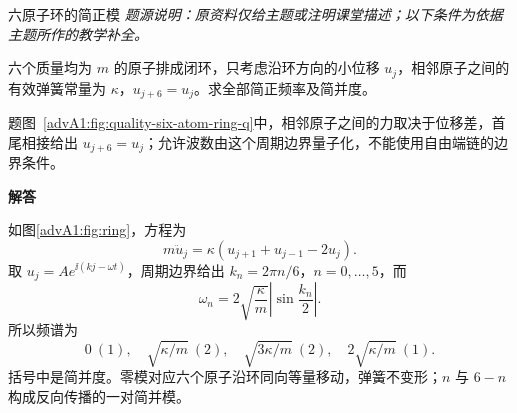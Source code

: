\begin{advexamplebox}{六原子环的简正模}\label{advA1:ex:six-atom-ring}
\emph{题源说明：原资料仅给主题或注明课堂描述；以下条件为依据主题所作的教学补全。}\par
六个质量均为 $m$ 的原子排成闭环，只考虑沿环方向的小位移 $u_j$，相邻原子之间的有效弹簧常量为 $\kappa$，$u_{j+6}=u_j$。求全部简正频率及简并度。

\begin{qualityfigure}
\label{advA1:fig:quality-six-atom-ring-q}
\end{qualityfigure}
\end{advexamplebox}
\AdvHideHeadingtrue
\begin{advsolution}题图~\ref{advA1:fig:quality-six-atom-ring-q}中，相邻原子之间的力取决于位移差，首尾相接给出 $u_{j+6}=u_j$；允许波数由这个周期边界量子化，不能使用自由端链的边界条件。

\noindent\begin{minipage}{\linewidth}{\bfseries\color{DeepBlue}解答}\par
\begin{center}\begin{minipage}{\linewidth}\centering
{}
\label{advA1:fig:ring}
\end{minipage}\end{center}\end{minipage}

如图\ref{advA1:fig:ring}，方程为
\[
 m\ddot u_j=\kappa(u_{j+1}+u_{j-1}-2u_j).
\]
取 $u_j=Ae^{\ii(kj-\omega t)}$，周期边界给出
$k_n=2\pi n/6$，$n=0,\ldots,5$，而
\[
 \omega_n=2\sqrt{\frac\kappa m}\left|\sin\frac{k_n}{2}\right|.
\]
所以频谱为
\[
 \boxed{0\ (1),\quad \sqrt{\kappa/m}\ (2),\quad
 \sqrt{3\kappa/m}\ (2),\quad 2\sqrt{\kappa/m}\ (1)}.
\]
括号中是简并度。零模对应六个原子沿环同向等量移动，弹簧不变形；$n$ 与 $6-n$ 构成反向传播的一对简并模。
\end{advsolution}




\clearpage\endgroup
